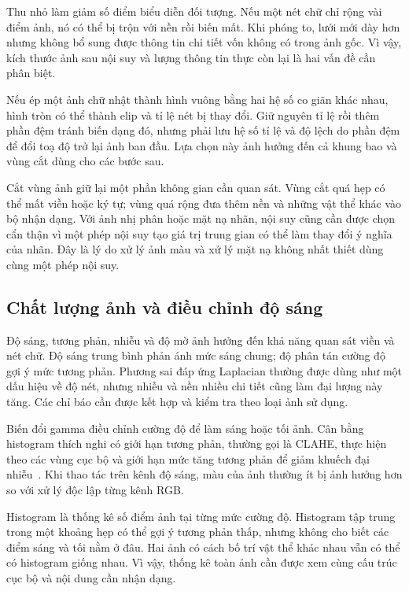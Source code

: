 Thu nhỏ làm giảm số điểm biểu diễn đối tượng. Nếu một nét chữ chỉ rộng vài điểm ảnh, nó có thể bị trộn với nền rồi biến mất. Khi phóng to, lưới mới dày hơn nhưng không bổ sung được thông tin chi tiết vốn không có trong ảnh gốc. Vì vậy, kích thước ảnh sau nội suy và lượng thông tin thực còn lại là hai vấn đề cần phân biệt.

Nếu ép một ảnh chữ nhật thành hình vuông bằng hai hệ số co giãn khác nhau, hình tròn có thể thành elip và tỉ lệ nét bị thay đổi. Giữ nguyên tỉ lệ rồi thêm phần đệm tránh biến dạng đó, nhưng phải lưu hệ số tỉ lệ và độ lệch do phần đệm để đổi toạ độ trở lại ảnh ban đầu. Lựa chọn này ảnh hưởng đến cả khung bao và vùng cắt dùng cho các bước sau.

Cắt vùng ảnh giữ lại một phần không gian cần quan sát. Vùng cắt quá hẹp có thể mất viền hoặc ký tự; vùng quá rộng đưa thêm nền và những vật thể khác vào bộ nhận dạng. Với ảnh nhị phân hoặc mặt nạ nhãn, nội suy cũng cần được chọn cẩn thận vì một phép nội suy tạo giá trị trung gian có thể làm thay đổi ý nghĩa của nhãn. Đây là lý do xử lý ảnh màu và xử lý mặt nạ không nhất thiết dùng cùng một phép nội suy.

\subsection{Chất lượng ảnh và điều chỉnh độ sáng}
Độ sáng, tương phản, nhiễu và độ mờ ảnh hưởng đến khả năng quan sát viền và nét chữ. Độ sáng trung bình phản ánh mức sáng chung; độ phân tán cường độ gợi ý mức tương phản. Phương sai đáp ứng Laplacian thường được dùng như một dấu hiệu về độ nét, nhưng nhiễu và nền nhiều chi tiết cũng làm đại lượng này tăng. Các chỉ báo cần được kết hợp và kiểm tra theo loại ảnh sử dụng.

Biến đổi gamma điều chỉnh cường độ để làm sáng hoặc tối ảnh. Cân bằng histogram thích nghi có giới hạn tương phản, thường gọi là CLAHE, thực hiện theo các vùng cục bộ và giới hạn mức tăng tương phản để giảm khuếch đại nhiễu~\cite{zuiderveld1994clahe,opencv_clahe}. Khi thao tác trên kênh độ sáng, màu của ảnh thường ít bị ảnh hưởng hơn so với xử lý độc lập từng kênh RGB.

Histogram là thống kê số điểm ảnh tại từng mức cường độ. Histogram tập trung trong một khoảng hẹp có thể gợi ý tương phản thấp, nhưng không cho biết các điểm sáng và tối nằm ở đâu. Hai ảnh có cách bố trí vật thể khác nhau vẫn có thể có histogram giống nhau. Vì vậy, thống kê toàn ảnh cần được xem cùng cấu trúc cục bộ và nội dung cần nhận dạng.

